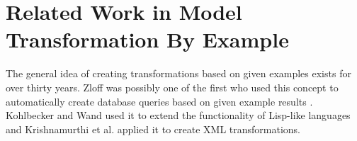 



\section{Related Work in Model Transformation By Example}\label{secRelatedWork}

The general idea of creating transformations based on given examples exists for over thirty years. Zloff was possibly one of the first who used this concept to automatically create database queries based on given example results \cite{Zloof1977}. Kohlbecker and Wand \cite{Island1987} used it to extend the functionality of Lisp-like languages and Krishnamurthi et al. \cite{Krishnamurthi2000} applied it to create XML transformations.


